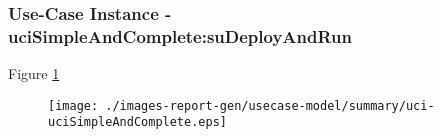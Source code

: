
	\subsubsection{Use-Case Instance - uciSimpleAndComplete:suDeployAndRun}
	

	
	Figure \ref{fig:lu.uni.lassy.excalibur.examples.icrash-RE-UC-uci-uciSimpleAndComplete}
	
	\begin{figure}[htbp]
	\begin{center}
	
	\texttt{[image: ./images-report-gen/usecase-model/summary/uci-uciSimpleAndComplete.eps]}
	\end{center}
	\caption[lu.uni.lassy.excalibur.examples.icrash Sequence Diagram: uci-uciSimpleAndComplete]{}
	\label{fig:lu.uni.lassy.excalibur.examples.icrash-RE-UC-uci-uciSimpleAndComplete}
	\end{figure}
	\vspace{0.5cm}
